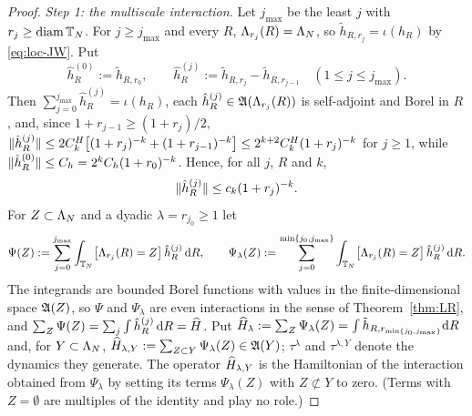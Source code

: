 \begin{proof}
\emph{Step 1: the multiscale interaction.} Let $j_{\max}$ be the least $j$ with $r_j\ge\operatorname{diam}\mathbb{T}_N$. For
$j\ge j_{\max}$ and every $R$, $\Lambda_{r_j}(R)=\Lambda_N$, so $\tilde h_{R,r_j}=\iota(h_R)$ by \eqref{eq:loc-JW}. Put
\[
\hat h^{(0)}_R:=\tilde h_{R,r_0},\qquad\hat h^{(j)}_R:=\tilde h_{R,r_j}-\tilde h_{R,r_{j-1}}\quad(1\le j\le j_{\max}).
\]
Then $\sum_{j=0}^{j_{\max}}\hat h^{(j)}_R=\iota(h_R)$, each $\hat h^{(j)}_R\in\mathfrak{A}(\Lambda_{r_j}(R))$ is self-adjoint and
Borel in $R$, and, since $1+r_{j-1}\ge(1+r_j)/2$,
$\lVert\hat h^{(j)}_R\rVert\le2C^H_k\bigl[(1+r_j)^{-k}+(1+r_{j-1})^{-k}\bigr]\le2^{k+2}C^H_k(1+r_j)^{-k}$ for $j\ge1$, while
$\lVert\hat h^{(0)}_R\rVert\le C_h=2^kC_h(1+r_0)^{-k}$. Hence, for all $j$, $R$ and $k$,
\begin{equation}\label{eq:loc-pieces}
\lVert\hat h^{(j)}_R\rVert\le c_k(1+r_j)^{-k}.
\end{equation}
For $Z\subset\Lambda_N$ and a dyadic $\lambda=r_{j_0}\ge1$ let
\[
\Psi(Z):=\sum_{j=0}^{j_{\max}}\int_{\mathbb{T}_N}\bigl[\Lambda_{r_j}(R)=Z\bigr]\,\hat h^{(j)}_R\,\mathrm{d} R,\qquad
\Psi_\lambda(Z):=\sum_{j=0}^{\min\{j_0,j_{\max}\}}\int_{\mathbb{T}_N}\bigl[\Lambda_{r_j}(R)=Z\bigr]\,\hat h^{(j)}_R\,\mathrm{d} R .
\]
The integrands are bounded Borel functions with values in the finite-dimensional space $\mathfrak{A}(Z)$, so $\Psi$ and
$\Psi_\lambda$ are even interactions in the sense of Theorem~\ref{thm:LR}, and $\sum_Z\Psi(Z)=\sum_j\int\hat h^{(j)}_R\,\mathrm{d} R
=\widehat{H}$. Put $\widehat{H}_\lambda:=\sum_Z\Psi_\lambda(Z)=\int\tilde h_{R,r_{\min\{j_0,j_{\max}\}}}\mathrm{d} R$ and, for $Y\subset\Lambda_N$,
$\widehat{H}_{\lambda,Y}:=\sum_{Z\subset Y}\Psi_\lambda(Z)\in\mathfrak{A}(Y)$; $\tau^\lambda$ and $\tau^{\lambda,Y}$ denote the dynamics
they generate. The operator $\widehat{H}_{\lambda,Y}$ is the Hamiltonian of the interaction obtained from $\Psi_\lambda$ by
setting its terms $\Psi_\lambda(Z)$ with $Z\not\subset Y$ to zero. (Terms with $Z=\emptyset$ are multiples of the
identity and play no role.)


\end{proof}
